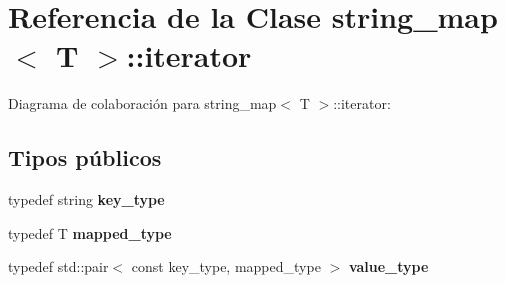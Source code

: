 \hypertarget{classstring__map_1_1iterator}{}\section{Referencia de la Clase string\+\_\+map$<$ T $>$\+:\+:iterator}
\label{classstring__map_1_1iterator}


Diagrama de colaboración para string\+\_\+map$<$ T $>$\+:\+:iterator\+:
\subsection*{Tipos públicos}
\begin{DoxyCompactItemize}
\item 
\mbox{\label{classstring__map_1_1iterator_a16eb7e34ca8bfcd4d5e35313d9a705c1}} 
typedef string {\bfseries key\+\_\+type}
\item 
\mbox{\label{classstring__map_1_1iterator_a0b1247eb38e91de58ef66285c7d7378e}} 
typedef T {\bfseries mapped\+\_\+type}
\item 
\mbox{\label{classstring__map_1_1iterator_adf55a6194045f596a69c8a7ec0e0b9fe}} 
typedef std\+::pair$<$ const key\+\_\+type, mapped\+\_\+type $>$ {\bfseries value\+\_\+type}
\end{DoxyCompactItemize}
